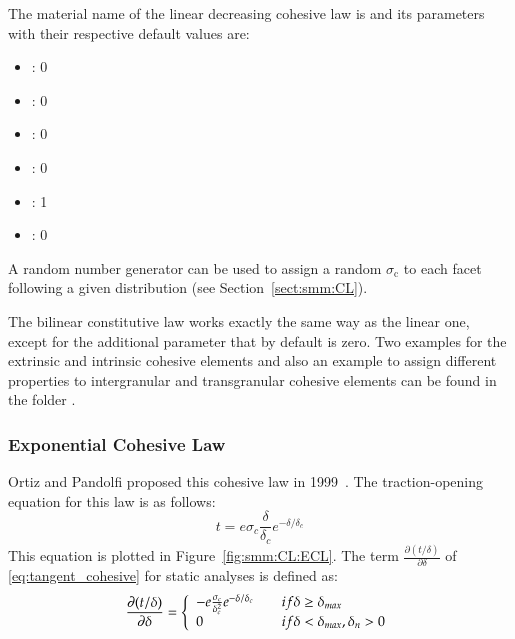 The material name of the linear decreasing cohesive law  is
 and its parameters with their
respective default values are:
\begin{itemize}
\item {}: 0
\item {}: 0
\item {}: 0
\item {}: 0
\item {}: 1
\item {}: 0
\end{itemize}
A random number generator can be used to assign a random
$\sigma_\mathrm{c}$ to each facet following a given
distribution (see Section~\ref{sect:smm:CL}).

The bilinear constitutive law works exactly the same way as the linear
one, except for the additional parameter  that by
default is zero. Two examples for the extrinsic and intrinsic cohesive
elements and also an example to assign different properties to
intergranular and transgranular cohesive elements can be found in
the folder .

\subsubsection{Exponential Cohesive Law}

Ortiz and Pandolfi proposed this cohesive law in 1999~\cite{ortiz1999}.  The
traction-opening equation for this law is as follows:
\begin{equation}
  \label{eq:exponential_law}
  t = e \sigma_c \frac{\delta}{\delta_c}e^{-\delta/ \delta_c}
\end{equation}
This equation is plotted in Figure~\ref{fig:smm:CL:ECL}. The term
$\frac{\partial{(t/\delta)}}{\partial{\delta}}$ of
\eqref{eq:tangent_cohesive} for static analyses is defined as:
\begin{equation}
  \frac{\partial{(t/ \delta)}}{\partial{\delta}} = \left\{\begin{array} {l l}
      -e  \frac{\sigma_c}{\delta_c^2  }e^{-\delta  /  \delta_c} &  \quad  if
      \delta \geq \delta_{max}\\
      0 & \quad if \delta < \delta_{max}, \delta_n > 0
    \end{array} \right.
\end{equation}


